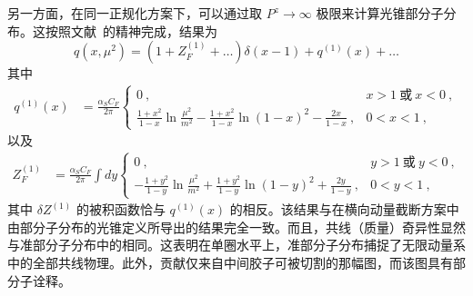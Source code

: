 另一方面，在同一正规化方案下，可以通过取 $P^z\rightarrow \infty$ 极限来计算光锥部分子分布。这按照文献~\cite{Weinberg:1966jm}的精神完成，结果为
\begin{equation}
                    q(x, \mu^2) = (1+ Z^{(1)}_F+ \dots) \delta(x-1) +  q^{(1)}(x) + \dots
\end{equation}
其中
\begin{align}\label{unpolvertexIMF}
q^{(1)}(x)&=\frac{\alpha_S C_F}{2\pi} \left\{ \begin{array} {ll} 0\ , & x>1\  \mbox{或}\  x<0\ , \\ \frac{1+x^2}{1-x}\ln \frac{\mu^2}{m^2}-\frac{1+x^2}{1-x}\ln{(1-x)^2}-\frac{2x}{1-x}\ , & 0<x<1\ ,\end{array} \right.
\end{align}
以及
\begin{align}\label{unpolselfIMF}
Z^{(1)}_F &=\frac{\alpha_S C_F}{2\pi} \int dy \left\{ \begin{array} {ll} 0 \ , & y>1 \ \mbox{或} \ y<0\ , \\ -\frac{1+y^2}{1-y}\ln \frac{\mu^2}{m^2}+\frac{1+y^2}{1-y}\ln{(1-y)^2}+\frac{2y}{1-y}\ , & 0<y<1\ , \end{array} \right.
\end{align}
其中 $\delta Z^{(1)}$ 的被积函数恰与 $q^{(1)}(x)$ 的相反。该结果与在横向动量截断方案中由部分子分布的光锥定义所导出的结果完全一致。而且，共线（质量）奇异性显然与准部分子分布中的相同。这表明在单圈水平上，准部分子分布捕捉了无限动量系中的全部共线物理。此外，贡献仅来自中间胶子可被切割的那幅图，而该图具有部分子诠释。
